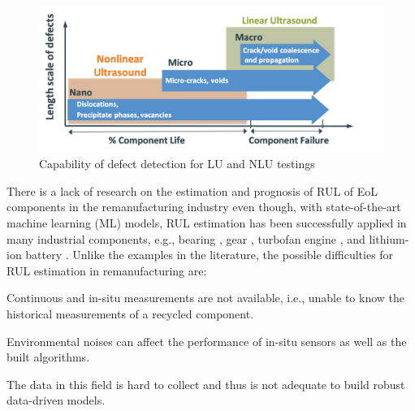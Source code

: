 \begin{figure}[tb]
    \includegraphics[width=\linewidth]{fig/lu_nlu_length_scales.png}
    \caption{Capability of defect detection for LU and NLU testings}
    \label{fig: lu nlu length scales}
\end{figure}

There is a lack of research on the estimation and prognosis of RUL of EoL components in the remanufacturing industry even though, with state-of-the-art machine learning (ML) models, RUL estimation has been successfully applied in many industrial components, e.g., bearing \cite{rul-nn-bearing-BENALI2015150, rul-cnn-bearing-LI20181, rul-ensemble-bearing}, gear \cite{rul-review-gear}, turbofan engine \cite{rul-statespace-turbo-battery-Mosallam2016,rul-cnn-turbo-LI20181,rul-rnn-turbo-WU2020241}, and lithium-ion battery \cite{rul-statespace-turbo-battery-Mosallam2016,rul-review-battery-LIPU2018115,rul-gpr-battery-9040661}. Unlike the examples in the literature, the possible difficulties for RUL estimation in remanufacturing are: 
\begin{enumerate*}[label=\itshape\alph*\upshape)]
    \item Continuous and in-situ measurements are not available, i.e., unable to know the historical measurements of a recycled component.
    \item Environmental noises can affect the performance of in-situ sensors as well as the built algorithms.
    \item The data in this field is hard to collect and thus is not adequate to build robust data-driven models.
\end{enumerate*}

